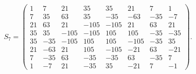 \begingroup
\small
\setlength{\arraycolsep}{3pt}
\[
S_{7}=\begin{pmatrix}
1 & 7 & 21 & 35 & 35 & 21 & 7 & 1 \\
7 & 35 & 63 & 35 & -35 & -63 & -35 & -7 \\
21 & 63 & 21 & -105 & -105 & 21 & 63 & 21 \\
35 & 35 & -105 & -105 & 105 & 105 & -35 & -35 \\
35 & -35 & -105 & 105 & 105 & -105 & -35 & 35 \\
21 & -63 & 21 & 105 & -105 & -21 & 63 & -21 \\
7 & -35 & 63 & -35 & -35 & 63 & -35 & 7 \\
1 & -7 & 21 & -35 & 35 & -21 & 7 & -1
\end{pmatrix}.
\]
\endgroup

